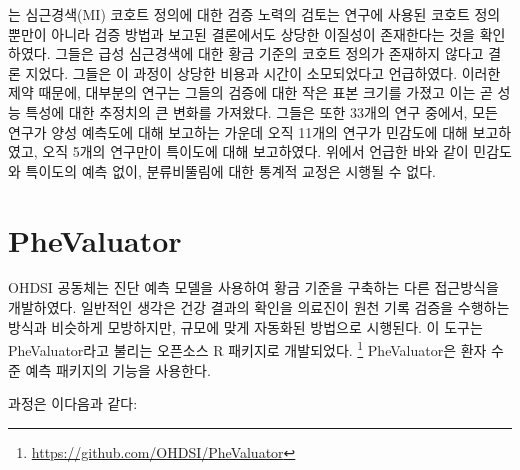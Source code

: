 \documentclass[11pt]{book}
\let\rmarkdownfootnote\footnote%
\def\footnote{\protect\rmarkdownfootnote}
\theoremstyle{definition}
\theoremstyle{definition}
\theoremstyle{definition}
\theoremstyle{remark}
\begin{document}
\citet{Rubbo2015phenotypes} 는 심근경색(MI) 코호트 정의에 대한 검증
노력의 검토는 연구에 사용된 코호트 정의뿐만이 아니라 검증 방법과 보고된
결론에서도 상당한 이질성이 존재한다는 것을 확인하였다. 그들은 급성
심근경색에 대한 황금 기준의 코호트 정의가 존재하지 않다고 결론 지었다.
그들은 이 과정이 상당한 비용과 시간이 소모되었다고 언급하였다. 이러한
제약 때문에, 대부분의 연구는 그들의 검증에 대한 작은 표본 크기를 가졌고
이는 곧 성능 특성에 대한 추정치의 큰 변화를 가져왔다. 그들은 또한 33개의
연구 중에서, 모든 연구가 양성 예측도에 대해 보고하는 가운데 오직 11개의
연구가 민감도에 대해 보고하였고, 오직 5개의 연구만이 특이도에 대해
보고하였다. 위에서 언급한 바와 같이 민감도와 특이도의 예측 없이,
분류비뚤림에 대한 통계적 교정은 시행될 수 없다.

\section{PheValuator}\label{phevaluator}


OHDSI 공동체는 진단 예측 모델을 사용하여 황금 기준을 구축하는 다른
접근방식을 개발하였다. \citep{Swerdel2019phevaluator} 일반적인 생각은
건강 결과의 확인을 의료진이 원천 기록 검증을 수행하는 방식과 비슷하게
모방하지만, 규모에 맞게 자동화된 방법으로 시행된다. 이 도구는
PheValuator라고 불리는 오픈소스 R 패키지로 개발되었다. \footnote{\url{https://github.com/OHDSI/PheValuator}}
PheValuator은 환자 수준 예측 패키지의 기능을 사용한다.

과정은 이다음과 같다:
\end{document}
